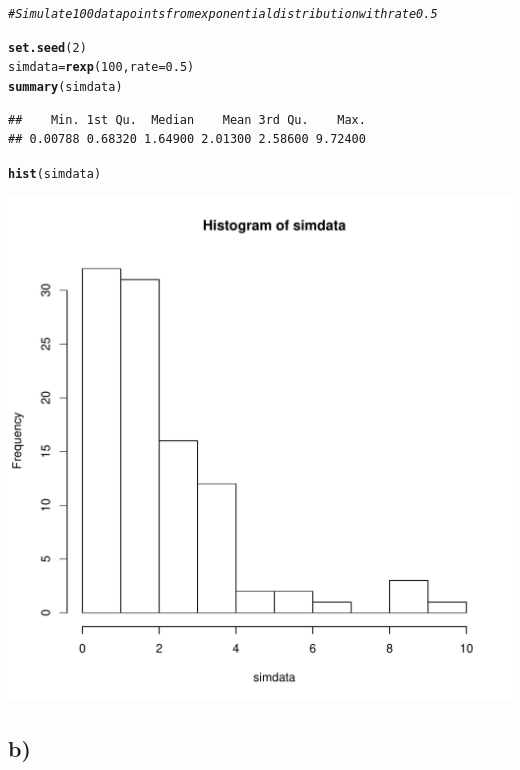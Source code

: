 \documentclass[12pt]{article}\usepackage[]{graphicx}\usepackage[]{color}
\makeatletter
\def\maxwidth{ %
  \ifdim\Gin@nat@width>\linewidth
    \linewidth
  \else
    \Gin@nat@width
  \fi
}
\newcommand{\hlnum}[1]{\textcolor[rgb]{0.686,0.059,0.569}{#1}}%
\newcommand{\hlcom}[1]{\textcolor[rgb]{0.678,0.584,0.686}{\textit{#1}}}%
\newcommand{\hlstd}[1]{\textcolor[rgb]{0.345,0.345,0.345}{#1}}%
\newcommand{\hlkwb}[1]{\textcolor[rgb]{0.69,0.353,0.396}{#1}}%
\newcommand{\hlkwc}[1]{\textcolor[rgb]{0.333,0.667,0.333}{#1}}%
\newcommand{\hlkwd}[1]{\textcolor[rgb]{0.737,0.353,0.396}{\textbf{#1}}}%
\newenvironment{kframe}{%
 \def\at@end@of@kframe{}%
 \ifinner\ifhmode%
  \def\at@end@of@kframe{\end{minipage}}%
  \begin{minipage}{\columnwidth}%
 \fi\fi%
 \def\FrameCommand##1{\hskip\@totalleftmargin \hskip-\fboxsep
 \colorbox{shadecolor}{##1}\hskip-\fboxsep
     \hskip-\linewidth \hskip-\@totalleftmargin \hskip\columnwidth}%
 \MakeFramed {\advance\hsize-\width
   \@totalleftmargin\z@ \linewidth\hsize
   \@setminipage}}%
 {\par\unskip\endMakeFramed%
 \at@end@of@kframe}
\newenvironment{knitrout}{}{} %
\makeatother
\begin{document}
\begin{knitrout}
\color{fgcolor}\begin{kframe}
\begin{alltt}
\hlcom{# Simulate 100 data points from exponential distribution with rate 0.5}

\hlkwd{set.seed}\hlstd{(}\hlnum{2}\hlstd{)}
\hlstd{simdata} \hlkwb{=} \hlkwd{rexp}\hlstd{(}\hlnum{100}\hlstd{,} \hlkwc{rate} \hlstd{=} \hlnum{0.5}\hlstd{)}
\hlkwd{summary}\hlstd{(simdata)}
\end{alltt}
\begin{verbatim}
##    Min. 1st Qu.  Median    Mean 3rd Qu.    Max. 
## 0.00788 0.68320 1.64900 2.01300 2.58600 9.72400
\end{verbatim}
\begin{alltt}
\hlkwd{hist}\hlstd{(simdata)}
\end{alltt}
\end{kframe}
\includegraphics[width=\maxwidth]{figure/unnamed-chunk-1-1} 

\end{knitrout}

\subsection*{b)}
\end{document}

